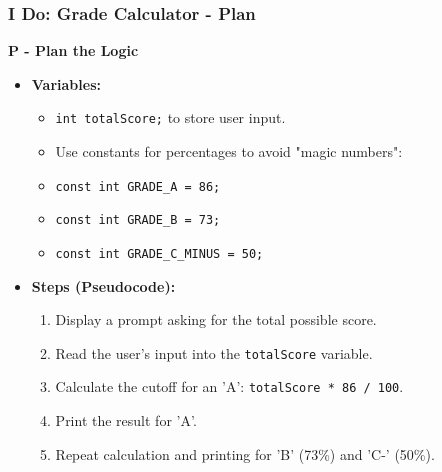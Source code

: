\documentclass{beamer}
\begin{document}
\begin{frame}
\frametitle{I Do: Grade Calculator - Plan}
\textbf{P - Plan the Logic}
\begin{itemize}
    \item \textbf{Variables:}
    \begin{itemize}
        \item \texttt{int totalScore;} to store user input.
        \item Use constants for percentages to avoid "magic numbers":
        \item \texttt{const int GRADE\_A = 86;}
        \item \texttt{const int GRADE\_B = 73;}
        \item \texttt{const int GRADE\_C\_MINUS = 50;}
    \end{itemize}
    \item \textbf{Steps (Pseudocode):}
    \begin{enumerate}
        \item Display a prompt asking for the total possible score.
        \item Read the user's input into the \texttt{totalScore} variable.
        \item Calculate the cutoff for an 'A': \texttt{totalScore * 86 / 100}.
        \item Print the result for 'A'.
        \item Repeat calculation and printing for 'B' (73\%) and 'C-' (50\%).
    \end{enumerate}
\end{itemize}
\end{frame}
\end{document}

